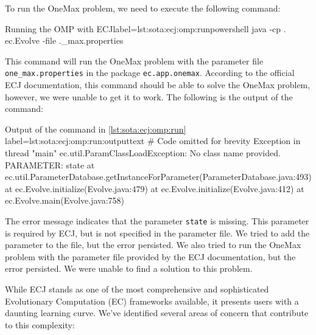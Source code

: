   To run the OneMax problem, we need to execute the following command:

  \begin{code}{Running the OMP with ECJ}{label=lst:sota:ecj:omp:run}{powershell}
    java -cp .
    ec.Evolve -file .\ec\app\onemax\one_max.properties  
  \end{code}

  This command will run the OneMax problem with the parameter file
  \texttt{one\_max.properties} in the package \texttt{ec.app.onemax}.
  According to the official ECJ documentation, this command should be able to 
  solve the OneMax problem, however, we were unable to get it to work.
  The following is the output of the command:

  \begin{code}{
    Output of the command in \cref{lst:sota:ecj:omp:run}
  }{label=lst:sota:ecj:omp:run:output}{text}
    # Code omitted for brevity
    Exception in thread "main" ec.util.ParamClassLoadException:
    No class name provided.
    PARAMETER: state
            at ec.util.ParameterDatabase.getInstanceForParameter(ParameterDatabase.java:493)
            at ec.Evolve.initialize(Evolve.java:479)
            at ec.Evolve.initialize(Evolve.java:412)
            at ec.Evolve.main(Evolve.java:758)
  \end{code}

  The error message indicates that the parameter \texttt{state} is missing.
  This parameter is required by ECJ, but is not specified in the parameter file.
  We tried to add the parameter to the file, but the error persisted.
  We also tried to run the OneMax problem with the parameter file provided by 
  the ECJ documentation, but the error persisted.
  We were unable to find a solution to this problem.

  While ECJ stands as one of the most comprehensive and sophisticated 
  Evolutionary Computation (EC) frameworks available, it presents users with a 
  daunting learning curve.
  We've identified several areas of concern that contribute to this complexity:


